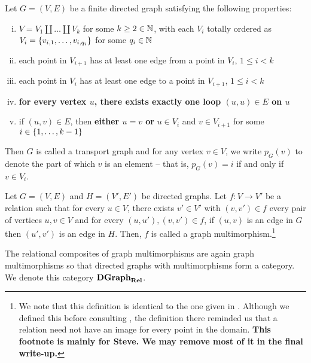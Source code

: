 \documentclass[./Thick_TQFTs_and_Quantum_Information.tex]{subfiles}
\begin{document}
\begin{defn}
Let $G = (V, E)$ be a finite directed graph satisfying the following properties:
\begin{enumerate}[(i)]
\setlength{\itemsep}{0pt}
\item $V = V_1 \amalg \dots \amalg V_k$ for some $k \geq 2 \in \mathbb{N}$, with each
$V_i$ totally ordered as $V_i = \set{v_{i, 1}, \dots, v_{i, q_i}}$ for some
$q_i \in \mathbb{N}$
\item each point in $V_{i + 1}$ has at least one edge from a point in $V_{i}$,
$1 \leq i < k$
\item each point in $V_{i}$ has at least one edge to a point in $V_{i + 1}$,
$1 \leq i < k$
\item \textbf{for every vertex $u$, there exists exactly one loop $(u, u) \in E$
on $u$}
\item if $(u, v) \in E$, then \textbf{either $u = v$ or} $u \in V_i$ and
$v \in V_{i + 1}$ for some $i \in \set{1, \dots, k - 1}$
\end{enumerate}
Then $G$ is called a transport graph and for any vertex $v \in V$, we write
$p_{G}(v)$ to denote the part of which $v$ is an element -- that is,
$p_G(v) = i$ if and only if $v \in V_i$.
\end{defn}


\begin{defn}
Let $G = (V, E)$ and $H = (V', E')$ be directed graphs. Let $f : V \to V'$ be a
relation such that for every $u \in V$, there exists $v' \in V'$ with
$(v, v') \in f$ every pair of vertices $u, v \in V$ and for every
$(u, u'), (v, v') \in f$, if $(u, v)$ is an edge in $G$ then $(u', v')$ is an
edge in $H$. Then, $f$ is called a graph multimorphism.\footnote{We note that
this definition is identical to the one given in \cite{PcLinTop}. Although we
defined this before consulting \cite{PcLinTop}, the definition there reminded us
that a relation need not have an image for every point in the domain.
\textbf{This footnote is mainly for Steve. We may remove most of it in the
final write-up.}}
\end{defn}

\begin{defn}
The relational composites of graph multimorphisms are again graph
multimorphisms so that directed graphs with multimorphisms form a category. We
denote this category $\textbf{DGraph}_{\textbf{Rel}}$.
\end{defn}
\end{document}

